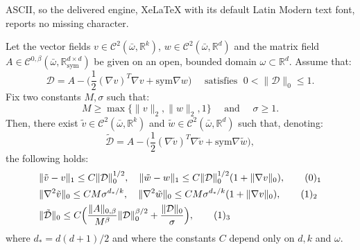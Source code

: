 \documentclass[10pt,a4paper]{amsart}
\newcommand{\R}{\mathbb{R}}
\newcommand{\sym}{\mathrm{sym}}
\begin{document}
ASCII, so the delivered engine, XeLaTeX with its default Latin Modern text font, reports no missing character.
\begin{theorem}\label{thm_stage}
Let the vector fields $v\in\mathcal{C}^2(\bar \omega,\R^k)$, $w\in\mathcal{C}^2(\bar\omega,\R^d)$ and
the matrix field $A\in\mathcal{C}^{0,\beta}(\bar\omega,\R^{d\times d}_\sym)$ be given on an open,
bounded domain $\omega\subset\R^d$. Assume that:
$$\mathcal{D}=A -\big(\frac{1}{2}(\nabla v)^T\nabla v + \sym\nabla
w\big) \quad \mbox{ satisfies } \; 0<\|\mathcal{D}\|_0\leq 1.$$
Fix two constants $M, \sigma$ such that:
$$M\geq\max\{\|v\|_2, \|w\|_2, 1\} \quad\mbox{ and }\quad \sigma\geq 1.$$
Then, there exist $\tilde v\in\mathcal{C}^2(\bar \omega,\R^k)$ and
$\tilde w\in\mathcal{C}^2(\bar\omega,\R^d)$ such that, denoting:
$$\tilde{\mathcal{D}}=A -\big(\frac{1}{2}(\nabla \tilde v)^T\nabla \tilde v + \sym\nabla \tilde w\big), $$
the following holds: 
\begin{align*}
& \|\tilde v - v\|_1\leq C\|\mathcal{D}\|_0^{1/2}, \quad \|\tilde w -
w\|_1\leq C\|\mathcal{D}\|_0^{1/2}(1+\|\nabla v\|_0),
\tag*{(\theequation)$_1$}\refstepcounter{equation} \label{Abound1}\vspace{1mm}\\
& \|\nabla^2\tilde v\|_0\leq CM\sigma^{d_*/k},\quad \|\nabla^2\tilde w\|_0\leq CM\sigma^{d_*/k}(1+\|\nabla v\|_0),
\tag*{(\theequation)$_2$}\label{Abound2} \\ 
& \|\tilde{\mathcal{D}}\|_0\leq C\Big(\frac{\|A\|_{0,\beta}}{M^\beta} \|\mathcal{D}\|_0^{\beta/2} +
\frac{\|\mathcal{D}\|_0}{\sigma}\Big), \tag*{(\theequation)$_3$} \label{Abound3}
\end{align*}
where $d_*=d(d+1)/2$ and where the constants $C$ depend only on $d, k$ and $\omega$.
\end{theorem}
\end{document}
